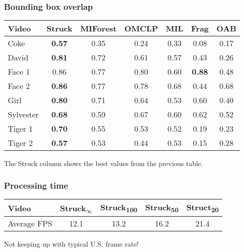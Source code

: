 \documentclass[mathserif,handout]{beamer}
\begin{document}
\begin{frame}
    \frametitle{Bounding box overlap}
    \begin{tabular}{l c c c c c c }
        \toprule
        Video & Struck & MIForest & OMCLP & MIL & Frag & OAB \\
        \midrule
        Coke      & \textbf{0.57} & 0.35 & 0.24 & 0.33 &         0.08  & 0.17 \\
        David     & \textbf{0.81} & 0.72 & 0.61 & 0.57 &         0.43  & 0.26 \\
        Face 1    &         0.86  & 0.77 & 0.80 & 0.60 & \textbf{0.88} & 0.48 \\
        Face 2    & \textbf{0.86} & 0.77 & 0.78 & 0.68 &         0.44  & 0.68 \\
        Girl      & \textbf{0.80} & 0.71 & 0.64 & 0.53 &         0.60  & 0.40 \\
        Sylvester & \textbf{0.68} & 0.59 & 0.67 & 0.60 &         0.62  & 0.52 \\
        Tiger 1   & \textbf{0.70} & 0.55 & 0.53 & 0.52 &         0.19  & 0.23 \\
        Tiger 2   & \textbf{0.57} & 0.53 & 0.44 & 0.53 &         0.15  & 0.28 \\
        \bottomrule
    \end{tabular}

    The Struck column shows the best values from the previous table.
\end{frame}

\begin{frame}
    \frametitle{Processing time}
    \begin{tabular}{l c c c c }
        \toprule
        Video & Struck\textsubscript{$\infty$} & Struck\textsubscript{100} & Struck\textsubscript{50} & Struct\textsubscript{20} \\
        \midrule
        Average FPS & 12.1    & 13.2    & 16.2    & 21.4 \\
        \bottomrule
    \end{tabular}

    Not keeping up with typical U.S. frame rate!
\end{frame}
\end{document}
